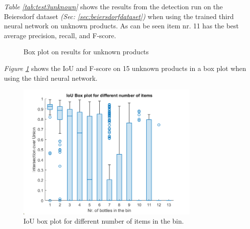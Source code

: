 \textit{Table \ref{tab:test3unknown}} shows the results from the detection run on the Beiersdorf dataset \textit{(Sec: \ref{sec:beiersdorfdataset})} when using the trained third neural network on unknown products. As can be seen item nr. 11 has the best average precision, recall, and F-score.

\begin{figure}[h]
    \centering
    \hfill
    
    \caption{Box plot on results for unknown products}
    \label{fig:v3unknowniou}
\end{figure}

\textit{Figure \ref{fig:v3unknowniou}} shows the IoU and F-score on 15 unknown products in a box plot when using the third neural network.
\begin{figure}[h]
    \centering
    \includegraphics[width=0.8\textwidth]{graphics/results/v3bottles.png}
    \caption{IoU box plot for different number of items in the bin.}
    \label{fig:v3bottles}
\end{figure}

